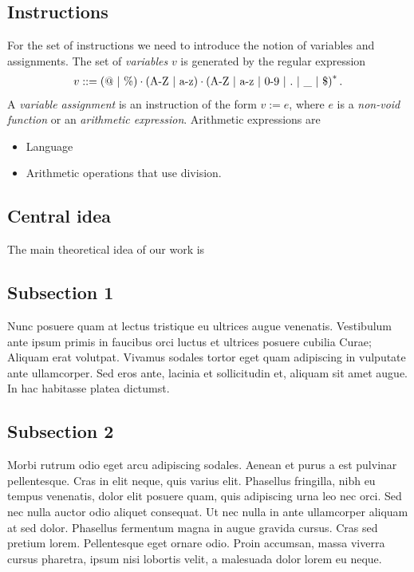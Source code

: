 \subsection{Instructions} 
For the set of instructions we need to introduce the notion of variables and assignments. The set of \emph{variables} $v$ is generated by the regular expression
\begin{align}
v::= (@\ |\ \%)\cdot\left(\text{A-Z\ |\ a-z}\right)\cdot\left(\text{A-Z\ |\ a-z\ |\ 0-9\ |\ .\ |\ \_\ |\ \$}\right)^{*}.
\end{align}
A \emph{variable assignment} is an instruction of the form $v:=e$, where $e$ is a \emph{non-void function} or an \emph{arithmetic expression}. Arithmetic expressions are 
\begin{itemize}
\item Language  
\item Arithmetic operations that use division.
\end{itemize}


\subsection{Central idea}
The main theoretical idea of our work is
\subsection{Subsection 1}

Nunc posuere quam at lectus tristique eu ultrices augue venenatis. Vestibulum ante ipsum primis in faucibus orci luctus et ultrices posuere cubilia Curae; Aliquam erat volutpat. Vivamus sodales tortor eget quam adipiscing in vulputate ante ullamcorper. Sed eros ante, lacinia et sollicitudin et, aliquam sit amet augue. In hac habitasse platea dictumst.


\subsection{Subsection 2}
Morbi rutrum odio eget arcu adipiscing sodales. Aenean et purus a est pulvinar pellentesque. Cras in elit neque, quis varius elit. Phasellus fringilla, nibh eu tempus venenatis, dolor elit posuere quam, quis adipiscing urna leo nec orci. Sed nec nulla auctor odio aliquet consequat. Ut nec nulla in ante ullamcorper aliquam at sed dolor. Phasellus fermentum magna in augue gravida cursus. Cras sed pretium lorem. Pellentesque eget ornare odio. Proin accumsan, massa viverra cursus pharetra, ipsum nisi lobortis velit, a malesuada dolor lorem eu neque.

